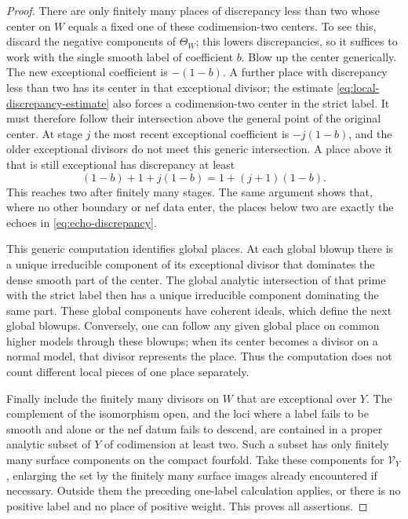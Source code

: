 \begin{proof}
There are only finitely many places of discrepancy less than two whose
center on \(W\) equals a fixed one of these codimension-two centers.  To see this, discard the negative
components of \(\Theta_W\); this lowers discrepancies, so it suffices to
work with the single smooth label of coefficient \(b\).  Blow up the center
generically.  The new exceptional coefficient is \(-(1-b)\).  A further
place with discrepancy less than two has its center in that exceptional
divisor; the estimate \eqref{eq:local-discrepancy-estimate} also forces a
codimension-two center in the strict label.  It must therefore follow their
intersection above the general point of the original center.  At stage
\(j\) the most recent exceptional coefficient is \(-j(1-b)\), and the
older exceptional divisors do not meet this generic intersection.  A place
above it that is still exceptional has discrepancy at least
\[
 (1-b)+1+j(1-b)=1+(j+1)(1-b).
\]
This reaches two after finitely many stages.  The same argument shows that,
where no other boundary or nef data enter, the places below two are exactly
the echoes in \eqref{eq:echo-discrepancy}.

This generic computation identifies global places.  At each global blowup
there is a unique irreducible component of its exceptional divisor that
dominates the dense smooth part of the center.  The global analytic
intersection of that prime with the strict label then has a unique
irreducible component dominating the same part.  These global components
have coherent ideals, which define the next global blowups.  Conversely,
one can follow any given global place on common higher models through these
blowups; when its center becomes a divisor on a normal model, that divisor
represents the place.  Thus the computation does not count different local
pieces of one place separately.

Finally include the finitely many divisors on \(W\) that are exceptional
over \(Y\).  The complement of the isomorphism open, and the loci where a
label fails to be smooth and alone or the nef datum fails to descend, are
contained in a proper analytic subset of \(Y\) of codimension at least
two.  Such a subset has only finitely many surface components on the compact
fourfold.  Take these components for \(\mathcal V_Y\), enlarging the set
by the finitely many surface images already encountered if necessary.
Outside them the preceding one-label calculation applies, or there is no
positive label and no place of positive weight.  This proves all assertions.
\end{proof}

